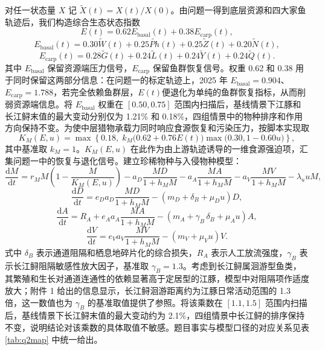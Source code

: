 对任一状态量 $X$ 记 $\widetilde X(t)=X(t)/X(0)$。由问题一得到底层资源和四大家鱼轨迹后，我们构造综合生态状态指数
\begin{equation}
E(t)=0.62E_{\text{basal}}(t)+0.38E_{\text{carp}}(t),
\end{equation}
\begin{equation}
E_{\text{basal}}(t)=0.30\widetilde W(t)+0.25\widetilde{Ph}(t)+0.25\widetilde Z(t)+0.20\widetilde N(t),
\end{equation}
\begin{equation}
E_{\text{carp}}(t)=0.28\widetilde G(t)+0.24\widetilde L(t)+0.24\widetilde Y(t)+0.24\widetilde Q(t).
\end{equation}
其中 $E_{\text{basal}}$ 保留资源端压力信号，$E_{\text{carp}}$ 保留鱼群恢复信号。权重 0.62 和 0.38 用于同时保留这两部分信息：在问题一的标定轨迹上，2025 年 $E_{\text{basal}}=0.904$、$E_{\text{carp}}=1.788$，若完全依赖鱼群层，$E(t)$便退化为单纯的鱼群恢复指标，从而削弱资源端信息。将 $E_{\text{basal}}$ 权重在 $[0.50,0.75]$ 范围内扫描后，基线情景下江豚和长江鲟末值的最大变动分别仅为 1.21\% 和 0.18\%，四组情景中的物种排序和作用方向保持不变。为使中层猎物承载力同时响应食源恢复和污染压力，按脚本实现取
\begin{equation}
K_M(E,u)=\max\left\{0.18,\;k_M\bigl(0.62+0.76E(t)\bigr)\max\bigl(0.30,1-0.60u\bigr)\right\},
\end{equation}
其中基准取 $k_M=1$。$K_M(E,u)$ 在此作为由上游轨迹诱导的一维食源强迫项，汇集问题一中的恢复与退化信号。建立珍稀物种与入侵物种模型\cite{holling1959}：
\begin{equation}
\frac{\mathrm{d}M}{\mathrm{d}t}
=r_M M\left(1-\frac{M}{K_M(E,u)}\right)
-a_D\frac{MD}{1+h_MM}
-a_A\frac{MA}{1+h_MM}
-a_V\frac{MV}{1+h_MM}
-\lambda_u uM,
\end{equation}
\begin{equation}
\frac{\mathrm{d}D}{\mathrm{d}t}
=e_D a_D\frac{MD}{1+h_MM}-(m_D+\delta_B+\mu_Du)D,
\end{equation}
\begin{equation}
\frac{\mathrm{d}A}{\mathrm{d}t}
=R_A+e_A a_A\frac{MA}{1+h_MM}-(m_A+\gamma_B\,\delta_B+\mu_Au)A,
\end{equation}
\begin{equation}
\frac{\mathrm{d}V}{\mathrm{d}t}
=e_V a_V\frac{MV}{1+h_MM}-(m_V+\mu_Vu)V.
\end{equation}
式中 $\delta_B$ 表示通道阻隔和栖息地碎片化的综合损失，$R_A$ 表示人工放流强度，$\gamma_B$ 表示长江鲟阻隔敏感性放大因子，基准取 $\gamma_B=1.3$。考虑到长江鲟属洄游型鱼类，其繁殖和生长对通道连通性的依赖显著高于定居型的江豚，模型中对阻隔项作适度放大；附件 1 给出的信息显示，长江鲟洄游距离约为江豚日常活动范围的 1.3 倍，这一数值也为 $\gamma_B$ 的基准取值提供了参照。将该乘数在 $[1.1,1.5]$ 范围内扫描后，基线情景下长江鲟末值的最大变动约为 2.1\%，四组情景中长江鲟的排序保持不变，说明结论对该乘数的具体取值不敏感。题目事实与模型口径的对应关系见表 \ref{tab:q2map} 中统一给出。

